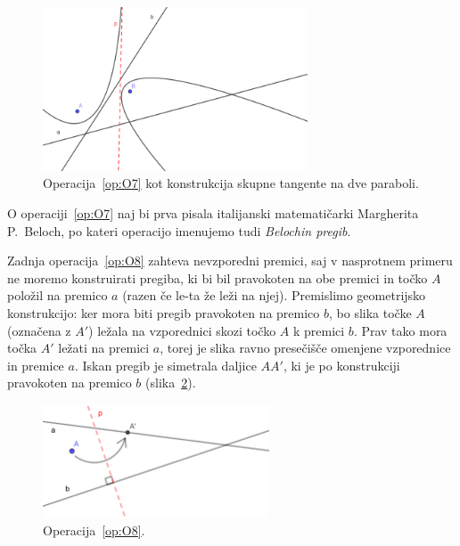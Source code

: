 \begin{figure}[h]
    \centering
    \includegraphics[width=0.7\textwidth]{images/origami_operacije/O7c_paraboli.png}
    \caption[Skupna tangenta na dve paraboli]{Operacija~\ref{op:O7} kot konstrukcija skupne tangente na dve paraboli.}
    \label{fig:O7_paraboli}
\end{figure}

\begin{opomba}
    O operaciji~\ref{op:O7} naj bi prva pisala italijanski matematičarki Margherita P.\ Beloch, po kateri operacijo imenujemo tudi \emph{Belochin pregib}.
\end{opomba}

Zadnja operacija~\ref{op:O8} zahteva nevzporedni premici, saj v nasprotnem primeru ne moremo konstruirati pregiba, ki bi bil pravokoten na obe premici in točko $A$ položil na premico $a$ (razen če le-ta že leži na njej). Premislimo geometrijsko konstrukcijo: ker mora biti pregib pravokoten na premico $b$, bo slika točke $A$ (označena z $A'$) ležala na vzporednici skozi točko $A$ k premici $b$. Prav tako mora točka $A'$ ležati na premici $a$, torej je slika ravno presečišče omenjene vzporednice in premice $a$. Iskan pregib je simetrala daljice $AA'$, ki je po konstrukciji pravokoten na premico $b$ (slika~\ref{fig:O8}).

\begin{figure}[h]
    \centering
    \includegraphics[width=0.6\textwidth]{images/origami_operacije/O8.png}
    \caption[Operacija~\ref{op:O8}]{Operacija~\ref{op:O8}.}
    \label{fig:O8}
\end{figure}

